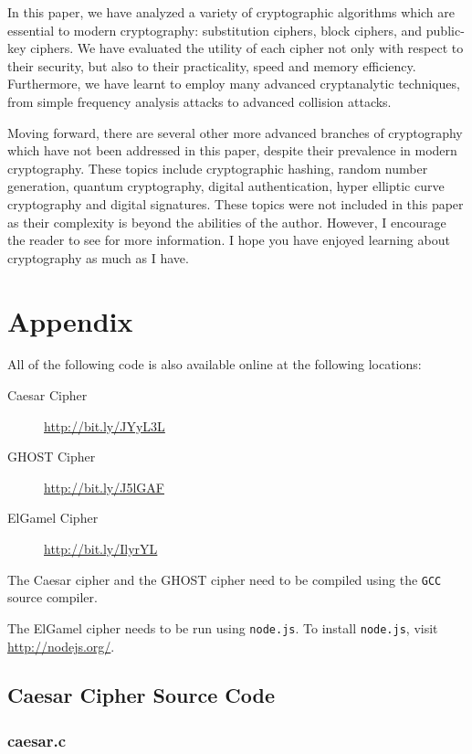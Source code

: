 \documentclass[12pt, a4paper, final]{report}
\begin{document}
In this paper, we have analyzed a variety of cryptographic algorithms which are
essential to modern cryptography: substitution ciphers, block ciphers, and
public-key ciphers. We have evaluated the utility of each cipher not only with
respect to their security, but also to their practicality, speed and
memory efficiency. Furthermore, we have learnt to employ many advanced
cryptanalytic techniques, from simple frequency analysis attacks to advanced
collision attacks.

Moving forward, there are several other more advanced branches of cryptography
which have not been addressed in this paper, despite their prevalence in modern
cryptography. These topics include cryptographic hashing, random number
generation, quantum cryptography, digital authentication, hyper elliptic curve
cryptography and digital signatures. These topics were not included in this
paper as their complexity is beyond the abilities of the author. However,
I encourage the reader to see \cite{silverman,schneier} for more information. I
hope you have enjoyed learning about cryptography as much as I have.

\clearpage



\clearpage
\section*{Appendix}

All of the following code is also available online at the following locations:
\begin{description}
    \item[\quad Caesar Cipher] \url{http://bit.ly/JYyL3L}
    \item[\quad GHOST Cipher] \url{http://bit.ly/J5lGAF}
    \item[\quad ElGamel Cipher] \url{http://bit.ly/IlyrYL}
\end{description}
The Caesar cipher and the GHOST cipher need to be compiled using the
\texttt{GCC} source compiler.

The ElGamel cipher needs to be run using \texttt{node.js}. To install
\texttt{node.js}, visit \url{http://nodejs.org/}.

\subsection*{Caesar Cipher Source Code}
\subsubsection*{caesar.c}
\inputminted[fontsize=\scriptsize]{c}{code/caesar.c}
\end{document}
